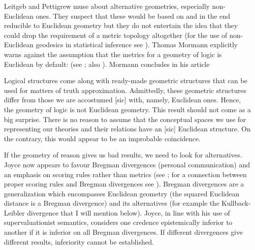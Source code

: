 \documentclass[smallextended]{svjour3}       %
\begin{document}
Leitgeb and Pettigrew muse about alternative geometries, especially
non-Euclidean ones. They suspect that these would be based on and in
the end reducible to Euclidean geometry but they do not entertain the
idea that they could drop the requirement of a metric topology
altogether (for the use of non-Euclidean geodesics in statistical
inference see ). Thomas Mormann explicitly warns
against the assumption that the metrics for a geometry of logic is
Euclidean by default:  (see ; also
). Mormann concludes in his article

\begin{quotex}
  Logical structures come along with ready-made geometric structures
  that can be used for matters of truth approximation. Admittedly,
  these geometric structures differ from those we are accostumed [sic]
  with, namely, Euclidean ones. Hence, the geometry of logic is not
  Euclidean geometry. This result should not come as a big surprise.
  There is no reason to assume that the conceptual spaces we use for
  representing our theories and their relations have an [sic]
  Euclidean structure. On the contrary, this would appear to be an
  improbable coincidence. 
\end{quotex}

If the geometry of reason gives us bad results, we need to look for
alternatives. Joyce now appears to favour Bregman divergences
(personal communication) and an emphasis on scoring rules rather than
metrics (see ; for a connection between
proper scoring rules and Bregman divergences see
). Bregman divergences are a
generalization which encompasses Euclidean geometry (the squared
Euclidean distance is a Bregman divergence) and its alternatives (for
example the Kullback-Leibler divergence that I will mention below).
Joyce, in line with his use of supervaluationist semantics, considers
one credence epistemically inferior to another if it is inferior on
all Bregman divergences. If different divergences give different
results, inferiority cannot be established.
\end{document}
